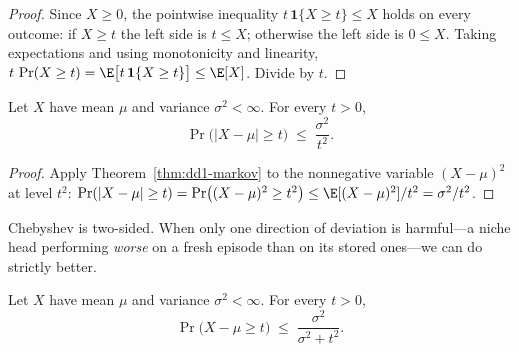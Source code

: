\begin{proof}
Since $X \ge 0$, the pointwise inequality
$t\,\mathbf{1}\{X \ge t\} \le X$ holds on every outcome: if $X \ge t$ the left
side is $t \le X$; otherwise the left side is $0 \le X$. Taking expectations
and using monotonicity and linearity,
$t\,\Pr(X \ge t) = \E\bigl[t\,\mathbf{1}\{X \ge t\}\bigr] \le \E[X]$.
Divide by $t$.
\end{proof}

\begin{corollary}
\label{cor:dd1-chebyshev}
Let $X$ have mean $\mu$ and variance $\sigma^2 < \infty$. For every $t > 0$,
\begin{equation}
\label{eq:dd1-chebyshev}
\Pr\bigl( |X - \mu| \ge t \bigr) \;\le\; \frac{\sigma^2}{t^2}.
\end{equation}
\end{corollary}

\begin{proof}
Apply Theorem~\ref{thm:dd1-markov} to the nonnegative variable
$(X - \mu)^2$ at level $t^2$:
$\Pr(|X - \mu| \ge t) = \Pr\bigl((X - \mu)^2 \ge t^2\bigr)
\le \E[(X-\mu)^2] / t^2 = \sigma^2 / t^2$.
\end{proof}

Chebyshev is two-sided. When only one direction of deviation is harmful---a
niche head performing \emph{worse} on a fresh episode than on its stored
ones---we can do strictly better.

\begin{theorem}
\label{thm:dd1-cantelli}
Let $X$ have mean $\mu$ and variance $\sigma^2 < \infty$. For every $t > 0$,
\begin{equation}
\label{eq:dd1-cantelli}
\Pr\bigl( X - \mu \ge t \bigr) \;\le\; \frac{\sigma^2}{\sigma^2 + t^2}.
\end{equation}
\end{theorem}

